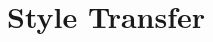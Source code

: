 \documentclass[doc_document.tex]{subfiles}
\begin{document}
\section{Style Transfer} \label{sec:style_transfer}
\end{document}
